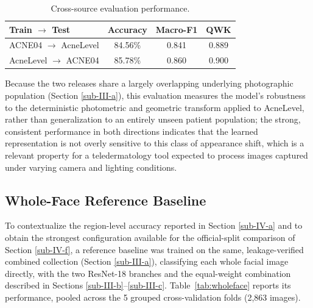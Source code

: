 \documentclass[conference]{IEEEtran}
\begin{document}
\begin{table}[H]
\caption{Cross-source evaluation performance.}
\begin{center}
\small
\begin{tabular}{|l|c|c|c|}
\hline
\textbf{Train} $\rightarrow$ \textbf{Test} & \textbf{Accuracy} & \textbf{Macro-F1} & \textbf{QWK} \\
\hline
ACNE04 $\rightarrow$ AcneLevel & 84.56\% & 0.841 & 0.889 \\
\hline
AcneLevel $\rightarrow$ ACNE04 & 85.78\% & 0.860 & 0.900 \\
\hline
\end{tabular}
\label{tab:cross}
\end{center}
\end{table}

Because the two releases share a largely overlapping underlying photographic population (Section \ref{sub-III-a}), this evaluation measures the model's robustness to the deterministic photometric and geometric transform applied to AcneLevel, rather than generalization to an entirely unseen patient population; the strong, consistent performance in both directions indicates that the learned representation is not overly sensitive to this class of appearance shift, which is a relevant property for a teledermatology tool expected to process images captured under varying camera and lighting conditions.

\FloatBarrier
\subsection{Whole-Face Reference Baseline}\label{sub-IV-e}

To contextualize the region-level accuracy reported in Section \ref{sub-IV-a} and to obtain the strongest configuration available for the official-split comparison of Section \ref{sub-IV-f}, a reference baseline was trained on the same, leakage-verified combined collection (Section \ref{sub-III-a}), classifying each whole facial image directly, with the two ResNet-18 branches and the equal-weight combination described in Sections \ref{sub-III-b}--\ref{sub-III-c}. Table~\ref{tab:wholeface} reports its performance, pooled across the 5 grouped cross-validation folds (2,863 images).
\end{document}
